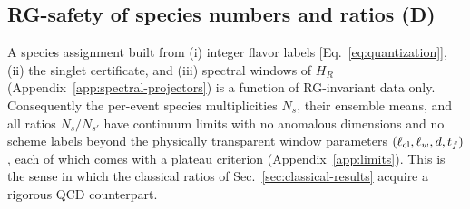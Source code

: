 \subsection{RG-safety of species numbers and ratios (D)}

A species assignment built from (i) integer flavor labels
[Eq.~\eqref{eq:quantization}], (ii) the singlet certificate, and (iii)
spectral windows of $H_R$ (Appendix~\ref{app:spectral-projectors}) is a
function of RG-invariant data only.  Consequently the per-event species
multiplicities $N_s$, their ensemble means, and all ratios
$N_s/N_{s'}$ have continuum limits with no anomalous dimensions and no
scheme labels beyond the physically transparent window parameters
$(\ell_{\rm cl},\ell_w,d,t_f)$, each of which comes with a plateau
criterion (Appendix~\ref{app:limits}).  This is the sense in which the
classical ratios of Sec.~\ref{sec:classical-results} acquire a rigorous
QCD counterpart.
